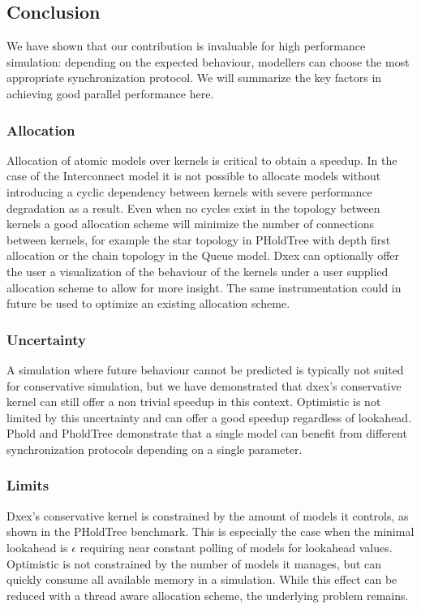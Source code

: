 \subsection{Conclusion}
We have shown that our contribution is invaluable for high performance simulation: depending on the expected behaviour, modellers can choose the most appropriate synchronization protocol.
We will summarize the key factors in achieving good parallel performance here. %
\subsubsection{Allocation}
Allocation of atomic models over kernels is critical to obtain a speedup. 
In the case of the Interconnect model it is not possible to allocate models without introducing a cyclic dependency between kernels with severe performance degradation as a result. 
Even when no cycles exist in the topology between kernels a good allocation scheme will minimize the number of connections between kernels, for example the star topology in PHoldTree with depth first allocation or the chain topology in the Queue model. 
Dxex can optionally offer the user a visualization of the behaviour of the kernels under a user supplied allocation scheme to allow for more insight. 
The same instrumentation could in future be used to optimize an existing allocation scheme.
\subsubsection{Uncertainty}
A simulation where future behaviour cannot be predicted is typically not suited for conservative simulation, but we have demonstrated that dxex's conservative kernel can still offer a non trivial speedup in this context. 
Optimistic is not limited by this uncertainty and can offer a good speedup regardless of lookahead. 
Phold and PholdTree demonstrate that a single model can benefit from different synchronization protocols depending on a single parameter.
\subsubsection{Limits}
Dxex's conservative kernel is constrained by the amount of models it controls, as shown in the PHoldTree benchmark. This is especially the case when the minimal lookahead is $\epsilon$ requiring near constant polling of models for lookahead values. 
Optimistic is not constrained by the number of models it manages, but can quickly consume all available memory in a simulation. While this effect can be reduced with a thread aware allocation scheme, the underlying problem remains.
